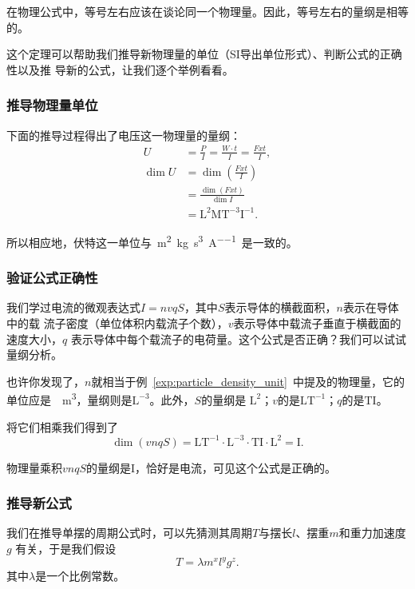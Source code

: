 \begin{rawthm}
    在物理公式中，等号左右应该在谈论同一个物理量。因此，等号左右的量纲是相等的。
\end{rawthm}

这个定理可以帮助我们推导新物理量的单位（SI导出单位形式）、判断公式的正确性以及推
导新的公式，让我们逐个举例看看。

\subsubsection{推导物理量单位}

下面的推导过程得出了电压这一物理量的量纲：
\begin{align*}
    U &= \frac{P}{I} = \frac{W\cdot t}{I} = \frac{Fxt}{I},\\
    \dim U &= \dim \left( \frac{Fxt}{I} \right) \\
                      &= \frac{\dim (Fxt)}{\dim I} \\
                      &= \mathrm{L^2MT^{-3}I^{-1}}
.\end{align*} 

所以相应地，伏特这一单位与~\unit{\square\m\kg\per\cubic\s\per\A}~是一致的。

\subsubsection{验证公式正确性}

我们学过电流的微观表达式$I=nvqS$，其中$S$表示导体的横截面积，$n$表示在导体中的载
流子密度（单位体积内载流子个数），$v$表示导体中载流子垂直于横截面的速度大小，$q$
表示导体中每个载流子的电荷量。这个公式是否正确？我们可以试试量纲分析。

也许你发现了，$n$就相当于例~\ref{exp:particle_density_unit}~中提及的物理量，它的
单位应是~\unit{\per\cubic\meter}，量纲则是$\mathrm{L^{-3}}$。此外，$S$的量纲是
$\mathrm{L^2}$；$v$的是$\mathrm{LT^{-1}}$；$q$的是$\mathrm{TI}$。

将它们相乘我们得到了
\[
    \dim (vnqS) = \mathrm{LT^{-1}\cdot L^{-3}\cdot TI\cdot L^2 = I }
.\] 

物理量乘积$vnqS$的量纲是$\mathrm{I}$，恰好是电流，可见这个公式是正确的。

\subsubsection{推导新公式}

我们在推导单摆的周期公式时，可以先猜测其周期$T$与摆长$l$、摆重$m$和重力加速度$g$
有关，于是我们假设
\[
    T = \lambda m^{x}l^{y}g^{z}   
.\]
其中$\lambda $是一个比例常数。

